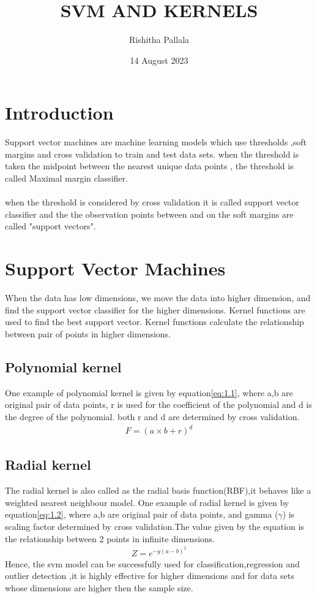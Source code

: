 \documentclass{article}
\title{SVM AND KERNELS}
\author{Rishitha Pallala }
\date{14 August 2023}
\begin{document}
\maketitle
\section{Introduction}
 Support vector machines are machine learning models which use thresholds ,soft margins and cross validation to train and test data sets.
 when the threshold is taken the midpoint between the nearest unique data points , the threshold is called Maximal margin classifier. \\\\when the threshold is considered by cross validation it is called support vector classifier and the the observation points between and on the soft margins are called "support vectors".
 \section{Support Vector Machines}
  When the data has low dimensions, we move the data into higher dimension, and find the support vector classifier for the higher dimensions. Kernel functions are used to find the best support vector. Kernel functions calculate the relationship between pair of points in higher dimensions.
  \subsection{Polynomial kernel }
One example of polynomial kernel is given by equation\eqref{eq:1.1}, where a,b are original pair of data points, r is used for the coefficient of the polynomial and d is the degree of the polynomial. both r and d are determined by cross validation.
\begin{align}
    F= (a\times b + r)^d\label{eq:1.1}
\end{align}
\subsection{Radial kernel}
The radial kernel is also called as the radial basis function(RBF),it behaves like a weighted nearest neighbour model.
    One example of radial kernel is given by equation\eqref{eq:1.2}, where a,b are original pair of data points, and gamma ($\gamma$) is scaling factor determined by cross validation.The value given by the equation is the relationship between 2 points in infinite dimensions.
    \begin{align}
        Z=e^{-y{(a-b)}^2}\label{eq:1.2}
    \end{align}
    Hence, the svm model can be successfully used for classification,regression and outlier detection ,it is highly effective for higher dimensions and for data sets whose dimensions are higher then the sample size.
\end{document}
